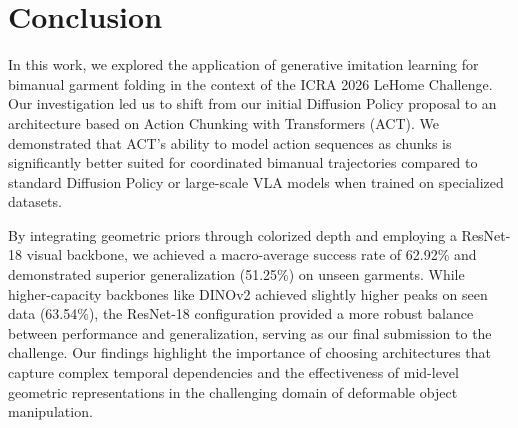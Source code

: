 \section{Conclusion}
\label{sec:conclusion}

In this work, we explored the application of generative imitation learning for bimanual garment folding in the context of the ICRA 2026 LeHome Challenge. Our investigation led us to shift from our initial Diffusion Policy proposal to an architecture based on Action Chunking with Transformers (ACT). We demonstrated that ACT's ability to model action sequences as chunks is significantly better suited for coordinated bimanual trajectories compared to standard Diffusion Policy or large-scale VLA models when trained on specialized datasets.

By integrating geometric priors through colorized depth and employing a ResNet-18 visual backbone, we achieved a macro-average success rate of 62.92\% and demonstrated superior generalization (51.25\%) on unseen garments. While higher-capacity backbones like DINOv2 achieved slightly higher peaks on seen data (63.54\%), the ResNet-18 configuration provided a more robust balance between performance and generalization, serving as our final submission to the challenge. Our findings highlight the importance of choosing architectures that capture complex temporal dependencies and the effectiveness of mid-level geometric representations in the challenging domain of deformable object manipulation.
